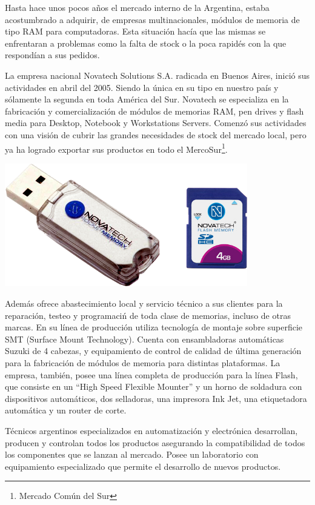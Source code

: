 \documentclass[%
 	final,
%
	notitlepage,
	narroweqnarray,
	inline,
 	twoside,
	]{ieee}
\begin{document}
Hasta hace unos pocos a\~nos el mercado interno de la Argentina, estaba acostumbrado a adquirir, de empresas multinacionales, m\'odulos de memoria de tipo RAM para computadoras. Esta situaci\'on hac\'ia que las mismas se enfrentaran a problemas como la falta de stock o la poca rapid\'es con la que respond\'ian a sus pedidos.

La empresa nacional Novatech Solutions S.A. radicada en Buenos Aires, inici\'o sus actividades en abril del 2005. Siendo la \'unica en su tipo en nuestro pa\'is y s\'olamente la segunda en toda Am\'erica del Sur. Novatech se especializa en la fabricaci\'on y comercializaci\'on de m\'odulos de memorias RAM, pen drives y flash media para Desktop, Notebook y Workstations Servers. Comenz\'o sus actividades con una visi\'on de cubrir las grandes necesidades de stock del mercado local, pero ya ha logrado exportar sus productos en todo el MercoSur\footnote{Mercado Com\'un del Sur\cite{mercosur}}.

\begin{center}\includegraphics[width=300pt, height=152pt]{novatech.png}\end{center}

Adem\'as ofrece abastecimiento local y servicio t\'ecnico a sus clientes para la reparaci\'on, testeo y programaci\'n de toda clase de memorias, incluso de otras marcas. En su l\'inea de producci\'on utiliza tecnolog\'ia de montaje sobre superficie SMT (Surface Mount Technology). Cuenta con ensambladoras autom\'aticas Suzuki de 4 cabezas, y equipamiento de control de calidad de \'ultima generaci\'on para la fabricaci\'on de m\'odulos de memoria para distintas plataformas. La empresa, tambi\'en, posee una l\'inea completa de producci\'on para la l\'inea Flash, que consiste en un ``High Speed Flexible Mounter'' y un horno de soldadura con dispositivos autom\'aticos, dos selladoras, una impresora Ink Jet, una etiquetadora autom\'atica y un router de corte.

T\'ecnicos argentinos especializados en automatizaci\'on y electr\'onica desarrollan, producen y controlan todos los productos asegurando la compatibilidad de todos los componentes que se lanzan al mercado. Posee un laboratorio con equipamiento especializado que permite el desarrollo de nuevos productos.
\end{document}
